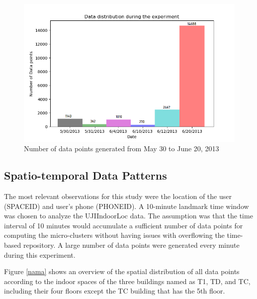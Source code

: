 \begin{figure}[!ht]
    \centering
    \includegraphics[width = 12 cm]{image/Chapters/Chapter6/timedist.png}
    \caption{Number of data points generated from May 30 to June 20, 2013}
    \label{timeline}
\end{figure}

\subsection{Spatio-temporal Data Patterns}

The most relevant observations for this study were the location of the user (SPACEID) and user's phone (PHONEID). A 10-minute landmark time window was chosen to analyze the UJIIndoorLoc data. The assumption was that the time interval of 10 minutes would accumulate a sufficient number of data points for computing the micro-clusters without having issues with overflowing the time-based repository. A large number of data points were generated every minute during this experiment.

Figure \ref{nama} shows an overview of the spatial distribution of all data points according to the indoor spaces of the three buildings named as T1, TD, and TC, including their four floors except the TC  building that has the 5th floor. 

